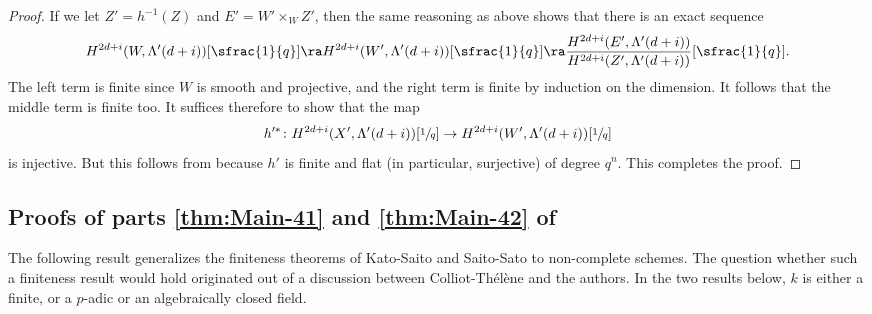 \begin{proof}
If we let $Z' = h^{-1}(Z)$ and $E' = W' \times_W Z'$, then the same reasoning
as above shows that there is an exact sequence
\begin{align*}
H^{2d+i}(W, \Lambda'(d+i))[\sfrac{1}{q}] \ra
H^{2d+i}(W', \Lambda'(d+i))[\sfrac{1}{q}] \ra
\frac{H^{2d+i}(E', \Lambda'(d+i))}{H^{2d+i}(Z', \Lambda'(d+i))}[\sfrac{1}{q}].
\end{align*}
The left term is finite since $W$ is smooth and projective, and the right term
is finite by induction on the dimension. It follows that the middle term is
finite too. It suffices therefore to show that the map
\[
h^{\prime \ast} \colon H^{2d+i}(X',\Lambda'(d+i))[\sfrac{1}{q}] \to
H^{2d+i}(W',\Lambda'(d+i))[\sfrac{1}{q}]
\]
is injective. But this follows from \cite[Prop.\,6.3]{Cisinski-Deglise}
because $h'$ is finite and flat (in particular, surjective) of degree $q^n$.
This completes the proof.
\end{proof}

\subsection{Proofs of parts \eqref{thm:Main-41} and \eqref{thm:Main-42} of }
\label{sec:M4-pf-1}
The following result generalizes the finiteness theorems of
Kato-Saito \cite{Kato-Saito-1} and Saito-Sato
\cite{SaitoSatoAnnals} to non-complete schemes.
The question whether such a finiteness result would hold originated out of
a discussion between Colliot-Thélène and the authors.
In the two results below, $k$ is either a finite, or a $p$-adic or an algebraically
closed field.

